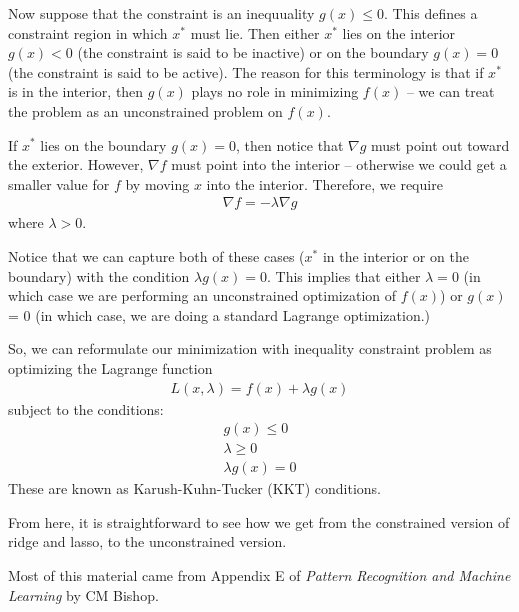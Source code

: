 \documentclass[10pt]{article}
\newcommand{\grad}{\nabla}
\begin{document}
\begin{enumerate}
{	Now suppose that the constraint is an inequuality $g(x) \leq 0$.  This defines a constraint region in which $x^*$ must lie.  Then either $x^*$ lies on the interior $g(x) < 0$ (the constraint is said to be inactive) or on the boundary $g(x) = 0$ (the constraint is said to be active).  The reason for this terminology is that if $x^*$ is in the interior, then $g(x)$ plays no role in minimizing $f(x)$ -- we can treat the problem as an unconstrained problem on $f(x)$.
	
	If $x^*$ lies on the boundary $g(x) = 0$, then notice that $\grad g$ must point out toward the exterior.  However, $\grad f$ must point into the interior -- otherwise we could get a smaller value for $f$ by moving $x$ into the interior.  Therefore, we require
	\begin{align*}
		\grad f = -\lambda \grad g
	\end{align*}
	where $\lambda > 0$.  

	Notice that we can capture both of these cases ($x^*$ in the interior or on the boundary) with the condition $\lambda g(x)  = 0$.  This implies that either $\lambda = 0$ (in which case we are performing an unconstrained optimization of $f(x)$) or $g(x)$ = 0 (in which case, we are doing a standard Lagrange optimization.)

	So, we can reformulate our minimization with inequality constraint problem as optimizing the Lagrange function 
	\begin{align*}
		L(x, \lambda) = f(x) + \lambda g(x)
	\end{align*} 
	subject to the conditions:
	\begin{align*}
		g(x) \leq 0 \\
		\lambda \geq 0 \\
		\lambda g(x) = 0
	\end{align*}
	These are known as Karush-Kuhn-Tucker (KKT) conditions.

	From here, it is straightforward to see how we get from the constrained version of ridge and lasso, to the unconstrained version.  

	Most of this material came from Appendix E of \emph{Pattern Recognition and Machine Learning} by CM Bishop.


}
\end{enumerate}
\end{document}
